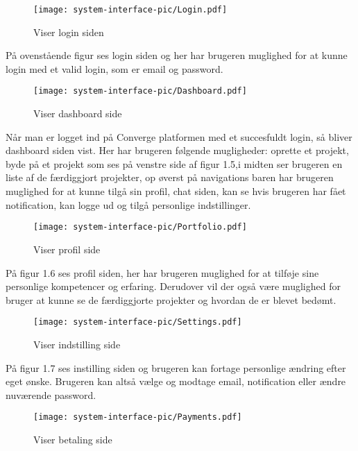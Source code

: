 \newpage
\begin{figure}[ht]
    \centering
\texttt{[image: system-interface-pic/Login.pdf]}
\caption{Viser login siden}
\label{fig:figure2}
\end{figure}

På ovenstående figur ses login siden og her har brugeren muglighed for at kunne login med et valid login, som er email og password. 

\begin{figure}[ht]
    \centering
\texttt{[image: system-interface-pic/Dashboard.pdf]}
\caption{Viser dashboard side}
\label{fig:figure2}
\end{figure}

Når man er logget ind på Converge platformen med et succesfuldt login, så bliver dashboard siden vist. Her har brugeren følgende mugligheder: oprette et projekt, byde på et projekt som ses på venstre side af figur 1.5,i midten ser brugeren en liste af de færdiggjort projekter, op øverst på navigations baren har brugeren muglighed for at kunne tilgå sin profil, chat siden, kan se hvis brugeren har fået notification, kan logge ud og tilgå personlige indstillinger.

\newpage
\begin{figure}[ht]
    \centering
\texttt{[image: system-interface-pic/Portfolio.pdf]}
\caption{Viser profil side}
\label{fig:figure2}
\end{figure}

På figur 1.6 ses profil siden, her har brugeren muglighed for at tilføje sine personlige kompetencer og erfaring. Derudover vil der også være muglighed for bruger at kunne se de færdiggjorte projekter og hvordan de er blevet bedømt. 

\begin{figure}[ht]
    \centering
\texttt{[image: system-interface-pic/Settings.pdf]}
\caption{Viser indstilling side}
\label{fig:figure2}
\end{figure}

På figur 1.7 ses instilling siden og brugeren kan fortage personlige ændring efter eget ønske. Brugeren kan altså vælge og modtage email, notification eller ændre nuværende password.

\newpage
\begin{figure}[ht]
    \centering
\texttt{[image: system-interface-pic/Payments.pdf]}
\caption{Viser betaling side}
\label{fig:figure2}
\end{figure}

